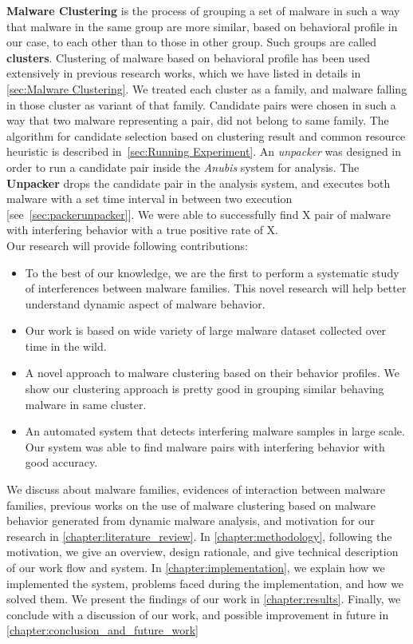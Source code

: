 \textbf{Malware Clustering} is the process of grouping a set of malware in such a way that malware in the same group are more similar, based on behavioral profile in our case, to each other than to those in other group.
Such groups are called \textbf{clusters}.
Clustering of malware based on behavioral profile has been used extensively in previous research works, which we have listed in details in \autoref{sec:Malware Clustering}.
We treated each cluster as a family, and malware falling in those cluster as variant of that family.
Candidate pairs were chosen in such a way that two malware representing a pair, did not belong to same family.
The algorithm for candidate selection based on clustering result and common resource heuristic is described in~\autoref{sec:Running Experiment}.
An \emph{unpacker} was designed in order to run a candidate pair inside the \emph{Anubis} system for analysis.
The \textbf{Unpacker} drops the candidate pair in the analysis system, and executes both malware with a set time interval in between two execution [see~\autoref{sec:packerunpacker}].
We were able to successfully find X pair of malware with interfering behavior with a true positive rate of X.\\

Our research will provide following contributions:
\begin{itemize}
  \item To the best of our knowledge, we are the first to perform a systematic study of interferences between malware families.
    This novel research will help better understand dynamic aspect of malware behavior.
  \item Our work is based on wide variety of large malware dataset collected over time in the wild.
  \item A novel approach to malware clustering based on their behavior profiles.
    We show our clustering approach is pretty good in grouping similar behaving malware in same cluster.
  \item An automated system that detects interfering malware samples in large scale.
  Our system was able to find malware pairs with interfering behavior with good accuracy.
\end{itemize}
We discuss about malware families, evidences of interaction between malware families, previous works on the use of malware clustering based on malware behavior generated from dynamic malware analysis, and motivation for our research in \autoref{chapter:literature_review}.
In \autoref{chapter:methodology}, following the motivation, we give an overview, design rationale, and give technical description of our work flow and system.
In \autoref{chapter:implementation}, we explain how we implemented the system, problems faced during the implementation, and how we solved them.
We present the findings of our work in \autoref{chapter:results}.
Finally, we conclude with a discussion of our work, and possible improvement in future in \autoref{chapter:conclusion_and_future_work}

